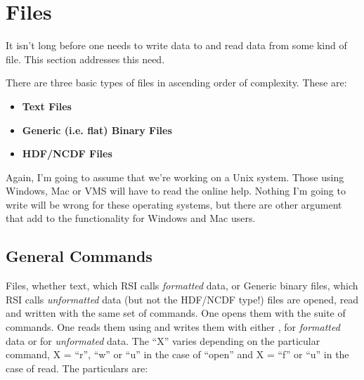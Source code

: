 \section{Files}\label{sec:Files}

  It isn't long before one needs to write data to and read data from
  some kind of file. This section addresses this need. 

  There are three basic types of files in ascending order of
  complexity. These are:

  \begin{itemize}
     \item \textbf{Text Files}
     \item \textbf{Generic (i.e. flat) Binary Files}
     \item \textbf{HDF/NCDF Files}
  \end{itemize}

  Again, I'm going to assume that we're working on a Unix
  system. Those using Windows, Mac or VMS will have to read
  the online help. Nothing I'm going to write will be wrong for these
  operating systems, but there are other argument that add to the
  functionality for Windows and Mac users.

\subsection{General Commands}\label{sec:GeneralIOCommands}


  Files, whether text, which RSI calls \textit{formatted} data, or
  Generic binary files, which RSI calls \textit{unformatted} data (but
  not the HDF/NCDF type!) files are opened, read and written with the
  same set of commands. One opens them with the 
  suite of commands. One reads them using  and
  writes them with either , for
  \textit{formatted} data or  for
  \textit{unformated} data. The ``X'' varies depending on the
  particular command, X = ``r'', ``w'' or ``u'' in the case of
  ``open'' and X = ``f'' or ``u'' in the case of read. The particulars
  are:

